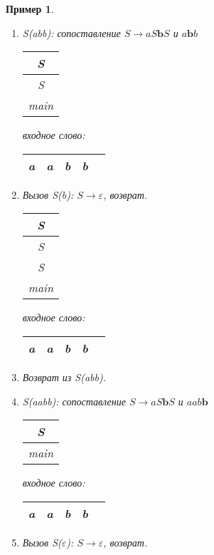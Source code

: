 \documentclass[10pt]{article}         %
\newtheorem{example}{Пример}
\begin{document}
\begin{example}
\begin{enumerate}
			\item S(abb): сопоставление $S \rightarrow aS\textbf{b}S$ и $a\textbf{b}b$
			
			\begin{tabular}[c]{ |c| } 
				\\ \hline
				S \\ \hline
				S \\ \hline
				main \\ \hline
			\end{tabular}  
			\qquad  \qquad \qquad  \qquad входное слово: \,
			\begin{tabular}[c]{ |c|c|c|c|c| } 
				\hline
				a & a & \textbf{b} & b \\ \hline
			\end{tabular}
		
		\item Вызов S(b): $S \rightarrow \varepsilon$, возврат.
		
		\begin{tabular}[c]{ |c| } 
			\\ \hline
			S \\ \hline
			S \\ \hline
			S \\ \hline
			main \\ \hline
		\end{tabular}  
		\qquad  \qquad \qquad  \qquad входное слово: \,
		\begin{tabular}[c]{ |c|c|c|c|c| } 
			\hline
			a & a & \textbf{b} & b \\ \hline
		\end{tabular}
		
		\item Возврат из S(abb).
		
		\item S(aabb): сопоставление $S \rightarrow aS\textbf{b}S$ и $aab\textbf{b}$
		
		\begin{tabular}[c]{ |c| } 
			\\ \hline
			S \\ \hline
			main \\ \hline
		\end{tabular}  
		\qquad  \qquad \qquad  \qquad входное слово: \,
		\begin{tabular}[c]{ |c|c|c|c|c| } 
			\hline
			a & a & b & \textbf{b} \\ \hline
		\end{tabular}
		
		\item Вызов S($\varepsilon$): $S \rightarrow \varepsilon$, возврат.
		

\end{enumerate}
\end{example}
\end{document}
